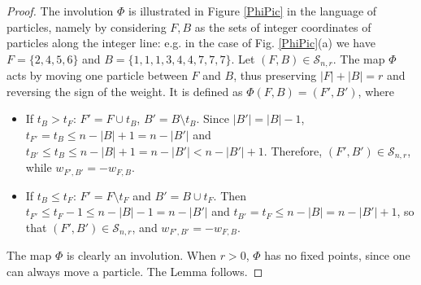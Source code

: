 \documentclass[12pt]{amsart}
\numberwithin{equation}{section}
\begin{document}
\begin{proof}
The involution $\Phi$ is illustrated in Figure \ref{PhiPic} in the language of particles, namely by considering $F,B$ as the sets of integer coordinates of particles along the integer line: e.g. in the case of Fig. \ref{PhiPic}(a) we have $F=\{2,4,5,6\}$ and $B=\{1,1,1,3,4,4,7,7,7\}$. Let $(F,B)\in\mathcal S_{n,r}$.
The map $\Phi$ acts by moving one particle between $F$ and $B$, thus preserving $|F|+|B|=r$ and reversing the sign of the weight. It is defined as $\Phi(F,B) = (F',B')$, where
\begin{itemize}
\item[(a)] If $t_B>t_F$:
{ $F'=F\cup t_B$, $B'=B\setminus t_B$. Since $|B'|=|B|-1$, $t_{F'} = t_B \leq n-|B|+1 = n-|B'|$ and $t_{B'} \leq t_B \leq n-|B|+1 = n-|B'| < n-|B'|+1$.  Therefore, $(F',B')\in\mathcal S_{n,r}$,  while $w_{F',B'}=-w_{F,B}$.
}
\item[(b)] If $t_B\leq t_F$:
{ $F' = F \setminus t_F$ and $B'=B\cup t_F$. Then $t_{F'} \leq t_{F}-1 \leq n-|B|-1 = n-|B'|$ and 
$t_{B'} = t_F \leq n-|B| = n-|B'|+1$, so that $(F',B')\in\mathcal S_{n,r}$, and $w_{F',B'}=-w_{F,B}$.
}
\end{itemize}
The map $\Phi$ is clearly an involution. When $r>0$, $\Phi$ has no fixed points,
since one can always move a particle. The Lemma follows.
\end{proof}

%
%
%
%
\end{document}
